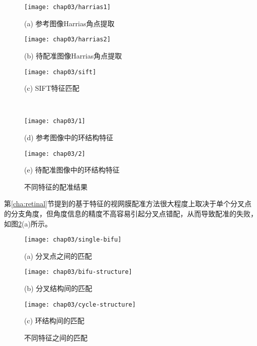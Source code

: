 \begin{figure}
\centering
\begin{minipage}[b]{0.48\textwidth} 
      \centering 
      \texttt{[image: chap03/harrias1]}
        \centerline{(a) 参考图像Harrias角点提取}\medskip
\end{minipage}
  \begin{minipage}[b]{0.48\textwidth}
    \centering
    \texttt{[image: chap03/harrias2]}
      \centerline{(b) 待配准图像Harrias角点提取}\medskip
  \end{minipage}
\begin{minipage}[b]{1\textwidth}
	\centering
      \texttt{[image: chap03/sift]}
        \centerline{(c) SIFT特征匹配}\medskip
    \end{minipage}
\\
  \begin{minipage}[b]{0.48\textwidth}
    \centering
    \texttt{[image: chap03/1]}
      \centerline{(d) 参考图像中的环结构特征}\medskip
  \end{minipage}
 \begin{minipage}[b]{0.48\textwidth}
    \centering
      \texttt{[image: chap03/2]}
        \centerline{(e) 待配准图像中的环结构特征}\medskip
    \end{minipage}
\caption{不同特征的配准结果}
\label{fig:ComparisionFeature}
\end{figure}

第\ref{cha:retinal}节提到的基于特征的视网膜配准方法很大程度上取决于单个分叉点的分支角度，但角度信息的精度不高容易引起分叉点错配，从而导致配准的失败，如图\ref{fig:matching}(a)所示。
\begin{figure}[H]
\centering
\begin{minipage}[b]{1\textwidth} 
      \centering 
      \texttt{[image: chap03/single-bifu]}
        \centerline{(a) 分叉点之间的匹配}\medskip
\end{minipage}
  \begin{minipage}[b]{1\textwidth}
    \centering
    \texttt{[image: chap03/bifu-structure]}
      \centerline{(b) 分叉结构间的匹配}\medskip
  \end{minipage}
\begin{minipage}[b]{1\textwidth}
	\centering
      \texttt{[image: chap03/cycle-structure]}
        \centerline{(c) 环结构间的匹配}\medskip
    \end{minipage}
\caption{不同特征之间的匹配}
\label{fig:matching}
\end{figure}

